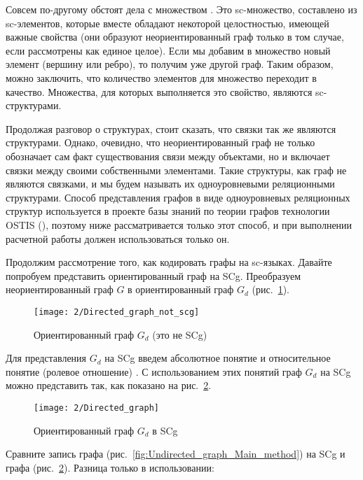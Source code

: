 Совсем по-другому обстоят дела с множеством . Это
sc-множество, составлено из sc-элементов, которые вместе обладают
некоторой целостностью, имеющей важные свойства (они образуют
неориентированный граф только в том случае, если рассмотрены как
единое целое). Если мы добавим в множество  новый
элемент (вершину или ребро), то получим уже другой граф. Таким образом,
можно заключить, что количество элементов для множество 
переходит в качество. Множества, для которых выполняется это свойство,
являются sc-структурами.

Продолжая разговор о структурах, стоит сказать, что связки так же
являются структурами. Однако, очевидно, что неориентированный граф
 не только обозначает сам факт существования связи между
объектами, но и включает связки между своими собственными
элементами. Такие структуры, как граф  не являются связками, и
мы будем называть их одноуровневыми реляционными структурами.  Способ
представления графов в виде одноуровневых реляционных структур
используется в проекте базы знаний по теории графов технологии OSTIS
(\ostisgtlink), поэтому
ниже рассматривается только этот способ, и при выполнении расчетной
работы должен использоваться только он.

Продолжим рассмотрение того, как кодировать графы на sc-языках.
Давайте попробуем представить ориентированный граф на SCg. Преобразуем
неориентированный граф $G$ в ориентированный граф $G_d$
(рис.~\ref{fig:Directed_graph_not_scg}).

\begin{figure}[h!]
  \centering
  \texttt{[image: 2/Directed\_graph\_not\_scg]}
  \caption{Ориентированный граф $G_d$ (это не SCg)}
  \label{fig:Directed_graph_not_scg}
\end{figure}

Для представления $G_d$ на SCg введем абсолютное понятие
 и относительное понятие (ролевое
отношение) . С использованием этих понятий граф $G_d$ на
SCg можно представить так, как показано на
рис.~\ref{fig:Directed_graph}.

\begin{figure}[h]
  \centering
  \texttt{[image: 2/Directed\_graph]}
  \caption{Ориентированный граф $G_d$ в SCg}
  \label{fig:Directed_graph}
\end{figure}

Сравните запись графа 
(рис.~\ref{fig:Undirected_graph_Main_method}) на SCg и графа
 (рис.~\ref{fig:Directed_graph}). Разница только в
использовании:

